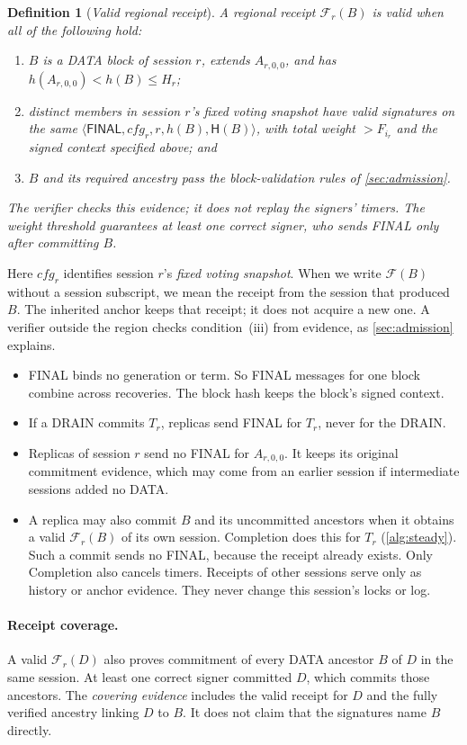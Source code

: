 \documentclass[11pt,a4paper]{article}
\newcommand{\FC}{\mathcal F}
\newcommand{\Hash}{\mathsf H}
\newcommand{\tagg}[1]{\ensuremath{\mathsf{#1}}}
\newcommand{\defterm}[1]{\textcolor{rrBlue}{\textit{#1}}}
\newtheorem{definition}{Definition}[section]
\begin{document}
\begin{definition}[\defterm{Valid regional receipt}]
\label{def:receipt}
A regional receipt $\FC_r(B)$ is valid when all of the following hold:
\begin{enumerate}[label=(\roman*)]
\item $B$ is a DATA block of session $r$, extends $A_{r,0,0}$, and has
$h(A_{r,0,0})<h(B)\le H_r$;
\item distinct members in session $r$'s fixed voting snapshot have
valid signatures on the same
$\langle\tagg{FINAL},\mathit{cfg}_r,r,h(B),\Hash(B)\rangle$,
with total weight $>F_{i_r}$ and the signed context specified above; and
\item $B$ and its required ancestry pass the block-validation rules of
\cref{sec:admission}.
\end{enumerate}
The verifier checks this evidence; it does not replay the signers'
timers. The weight threshold guarantees at least one correct signer,
who sends FINAL only after committing $B$.
\end{definition}
Here $\mathit{cfg}_r$ identifies session $r$'s \defterm{fixed voting snapshot}.
When we write $\FC(B)$ without a session subscript, we mean the receipt
from the session that produced $B$. The inherited anchor keeps that
receipt; it does not acquire a new one. A verifier outside
the region checks condition~(iii) from evidence, as
\cref{sec:admission} explains.
\begin{itemize}
\item FINAL binds no generation or term. So FINAL messages for one block
combine across recoveries. The block hash keeps the block's signed
context.
\item If a DRAIN commits $T_r$, replicas send FINAL for $T_r$, never for
the DRAIN.
\item Replicas of session $r$ send no FINAL for $A_{r,0,0}$. It keeps its original commitment evidence, which may come from an
earlier session if intermediate sessions added no DATA.
\item A replica may also commit $B$ and its uncommitted
ancestors when it obtains a valid $\FC_r(B)$ of its own session.
Completion does this for $T_r$ (\cref{alg:steady}). Such a commit
sends no FINAL, because the receipt already exists. Only Completion
also cancels timers. Receipts of other sessions serve only as history or anchor
evidence. They never change this session's locks or log.
\end{itemize}

\paragraph{Receipt coverage.}
\label{sec:coverage}
A valid $\FC_r(D)$ also proves commitment of every DATA ancestor $B$
of $D$ in the same session. At least one correct signer committed
$D$, which commits those ancestors. The \defterm{covering evidence} includes the
valid receipt for $D$ and the fully verified ancestry linking $D$ to $B$.
It does not claim that the signatures name $B$ directly.
\end{document}
